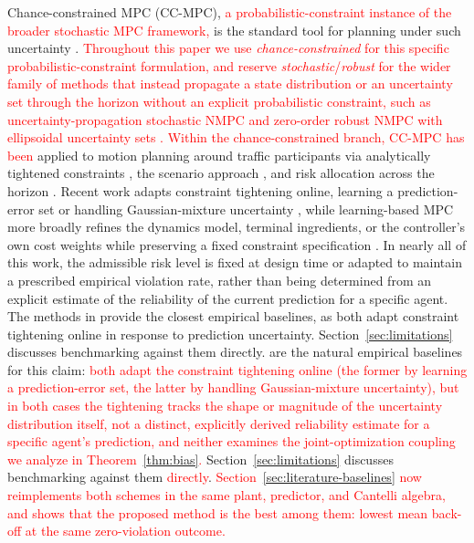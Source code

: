 \documentclass[letterpaper, 10 pt, conference]{ieeeconf}
\begin{document}
Chance-constrained MPC (CC-MPC), \textcolor{red}{a probabilistic-constraint instance of the broader stochastic MPC framework,} is the standard tool for planning under such uncertainty \cite{mesbah2016stochastic, farina2016stochastic}. \textcolor{red}{Throughout this paper we use \emph{chance-constrained} for this specific probabilistic-constraint formulation, and reserve \emph{stochastic}/\emph{robust} for the wider family of methods that instead propagate a state distribution or an uncertainty set through the horizon without an explicit probabilistic constraint, such as uncertainty-propagation stochastic NMPC \cite{zarrouki2024stochastic} and zero-order robust NMPC with ellipsoidal uncertainty sets \cite{zanelli2021zero,frey2024efficient}. Within the chance-constrained branch, CC-MPC has been} applied to motion planning around traffic participants \cite{blackmore2011chance} via analytically tightened constraints \cite{van2002conic}, the scenario approach \cite{schildbach2014scenario}, and risk allocation across the horizon \cite{ono2008iterative}. Recent work adapts constraint tightening online, learning a prediction-error set \cite{ma2026sensor} or handling Gaussian-mixture uncertainty \cite{engelaar2025stochastic}, while learning-based MPC more broadly refines the dynamics model, terminal ingredients, or the controller's own cost weights \cite{jahncke2026differentiable} while preserving a fixed constraint specification \cite{salzmann2020trajectron++, hewing2020learning,aswani2013provably,rosolia2017learning,wabersich2018linear,koller2018learning}. In nearly all of this work, the admissible risk level is fixed at design time or adapted to maintain a prescribed empirical violation rate, rather than being determined from an explicit estimate of the reliability of the current prediction for a specific agent. The methods in \cite{ma2026sensor,engelaar2025stochastic} provide the closest empirical baselines, as both adapt constraint tightening online in response to prediction uncertainty. Section~\ref{sec:limitations} discusses benchmarking against them directly. \cite{ma2026sensor,engelaar2025stochastic} are the natural empirical baselines for this claim: \textcolor{red}{both adapt the constraint tightening online (the former by learning a prediction-error set, the latter by handling Gaussian-mixture uncertainty), but in both cases the tightening tracks the shape or magnitude of the uncertainty distribution itself, not a distinct, explicitly derived reliability estimate for a specific agent's prediction, and neither examines the joint-optimization coupling we analyze in Theorem~\ref{thm:bias}.} Section~\ref{sec:limitations} discusses benchmarking against them \textcolor{red}{directly}. \textcolor{red}{Section~\ref{sec:literature-baselines} now reimplements both schemes in the same plant, predictor, and Cantelli algebra, and shows that the proposed method is the best among them: lowest mean back-off at the same zero-violation outcome.}
\end{document}
